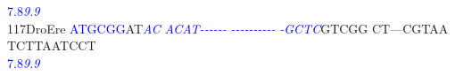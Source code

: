 \documentclass[11pt,twoside,reqno,a4paper]{article}
\begin{document}
{\hspace*{4\charwidth}\hspace*{7\charwidth}\hspace*{0\charwidth}\textcolor{Blue}{7.8}\hspace*{5\charwidth}\textit{\textcolor{Blue}{9.9}}\hspace*{1\charwidth}\hspace*{1\charwidth}\hspace*{1\charwidth}\hspace*{1\charwidth}\hspace*{1\charwidth}\hspace*{1\charwidth}\\
117\hspace*{1\charwidth}DroEre	\textcolor{Blue}{A}\textcolor{Blue}{T}\textcolor{Blue}{G}\textcolor{Blue}{C}\textcolor{Blue}{G}\textcolor{Blue}{G}AT\textit{\textcolor{Blue}{A}}\textit{\textcolor{Blue}{C}}	\textit{\textcolor{Blue}{A}}\textit{\textcolor{Blue}{C}}\textit{\textcolor{Blue}{A}}\textit{\textcolor{Blue}{T}}\textit{\textcolor{Blue}{-}}\textit{\textcolor{Blue}{-}}\textit{\textcolor{Blue}{-}}\textit{\textcolor{Blue}{-}}\textit{\textcolor{Blue}{-}}\textit{\textcolor{Blue}{-}}	\textit{\textcolor{Blue}{-}}\textit{\textcolor{Blue}{-}}\textit{\textcolor{Blue}{-}}\textit{\textcolor{Blue}{-}}\textit{\textcolor{Blue}{-}}\textit{\textcolor{Blue}{-}}\textit{\textcolor{Blue}{-}}\textit{\textcolor{Blue}{-}}\textit{\textcolor{Blue}{-}}\textit{\textcolor{Blue}{-}}	\textit{\textcolor{Blue}{-}}\textit{\textcolor{Blue}{G}}\textit{\textcolor{Blue}{C}}\textit{\textcolor{Blue}{T}}\textit{\textcolor{Blue}{C}}GTCGG	CT---CGTAA	TCTTAATCCT	\\
\hspace*{4\charwidth}\hspace*{7\charwidth}\hspace*{0\charwidth}\textcolor{Blue}{7.8}\hspace*{5\charwidth}\textit{\textcolor{Blue}{9.9}}\hspace*{1\charwidth}\hspace*{1\charwidth}\hspace*{1\charwidth}\hspace*{1\charwidth}\hspace*{1\charwidth}\hspace*{1\charwidth}\\
}
\end{document}
